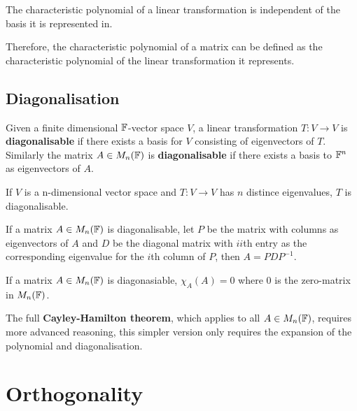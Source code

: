 \documentclass[../Year1.tex]{subfiles}
\begin{document}
\begin{theorem}
    The characteristic polynomial of a linear transformation is independent of the basis it is represented in.
\end{theorem}

\begin{remark}
    Therefore, the characteristic polynomial of a matrix can be defined as the characteristic polynomial of the linear transformation it represents.
\end{remark}

\subsection{Diagonalisation}
\begin{definition}[Diagonalisability]
    Given a finite dimensional $\mathbb{F}$-vector space $V$, a linear transformation $T:V\rightarrow V$ is \textbf{diagonalisable} if there exists a basis for $V$ consisting of eigenvectors of $T$. Similarly the matrix $A\in M_n(\mathbb{F})$ is \textbf{diagonalisable} if there exists a basis to $\mathbb{F}^n$ as eigenvectors of $A$.
\end{definition}

\begin{theorem}
    If $V$ is a n-dimensional vector space and $T:V\rightarrow V$ has $n$ distince eigenvalues, $T$ is diagonalisable.
\end{theorem}

\begin{theorem}
    If a matrix $A\in M_n(\mathbb{F})$ is diagonalisable,  let $P$ be the matrix with columns as eigenvectors of $A$ and $D$ be the diagonal matrix with $ii$th entry as the corresponding eigenvalue for the $i$th column of $P$, then $A=PDP^{-1}$.
\end{theorem}

\begin{theorem}
    If a matrix $A\in M_n(\mathbb{F})$ is diagonasiable, $\chi_A(A)=0$ where $0$ is the zero-matrix in $M_n(\mathbb{F})$.
\end{theorem}

\begin{note}
    The full \textbf{Cayley-Hamilton theorem}, which applies to all $A\in M_n(\mathbb{F})$, requires more advanced reasoning, this simpler version only requires the expansion of the polynomial and diagonalisation.
\end{note}

\section{Orthogonality}
\end{document}
